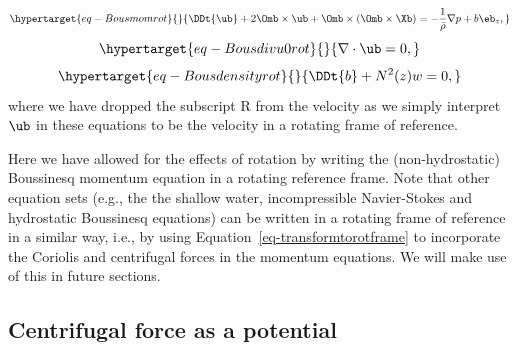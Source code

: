 \documentclass[
  letterpaper,
  twocolumn,
  landscape]{report}
\begin{document}
\begin{equation}\protect\hypertarget{eq-Bousmomrot}{}{ \DDt{\ub}  + 2\Omb\times\ub +\Omb\times(\Omb \times \Xb) = -\frac{1}{\bar\rho}\nabla p +b\eb_z, }\label{eq-Bousmomrot}\end{equation}
\begin{equation}\protect\hypertarget{eq-Bousdivu0rot}{}{  \nabla\cdot\ub = 0,}\label{eq-Bousdivu0rot}\end{equation}
\begin{equation}\protect\hypertarget{eq-Bousdensityrot}{}{ \DDt{b} +N^2(z)w=0,}\label{eq-Bousdensityrot}\end{equation}
where we have dropped the subscript \(\mathrm{R}\) from the velocity as
we simply interpret \(\ub\) in these equations to be the velocity in a
rotating frame of reference.

\begin{tcolorbox}[enhanced jigsaw, toprule=.15mm, left=2mm, opacityback=0, breakable, arc=.35mm, colback=white, rightrule=.15mm, bottomrule=.15mm, colframe=quarto-callout-note-color-frame, leftrule=.75mm]
\begin{minipage}[t]{5.5mm}
\textcolor{quarto-callout-note-color}{\faInfo}
\end{minipage}%
\begin{minipage}[t]{\textwidth - 5.5mm}

Here we have allowed for the effects of rotation by writing the
(non-hydrostatic) Boussinesq momentum equation in a rotating reference
frame. Note that other equation sets (e.g., the the shallow water,
incompressible Navier-Stokes and hydrostatic Boussinesq equations) can
be written in a rotating frame of reference in a similar way, i.e., by
using Equation~\ref{eq-transformtorotframe} to incorporate the Coriolis
and centrifugal forces in the momentum equations. We will make use of
this in future sections.

\end{minipage}%
\end{tcolorbox}

\hypertarget{sec-centrifugalpotential}{%
\subsection{Centrifugal force as a
potential}\label{sec-centrifugalpotential}}
\end{document}
